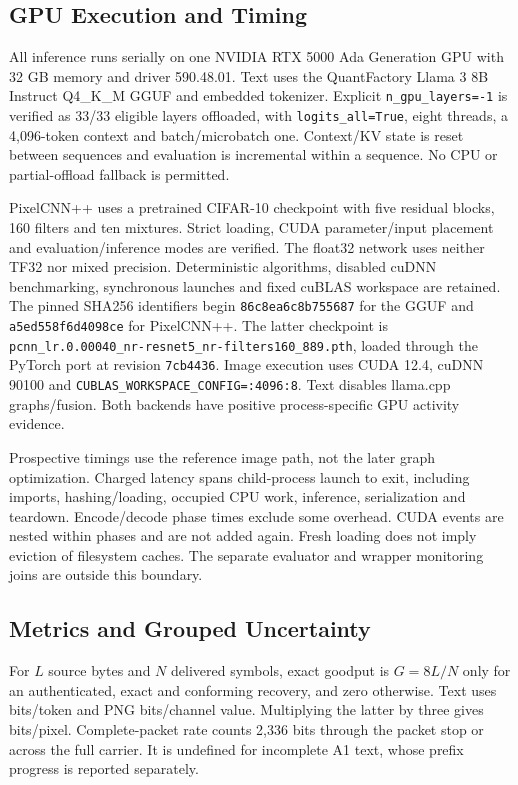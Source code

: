 \subsection{GPU Execution and Timing}
\label{sec:hardware}
All inference runs serially on one NVIDIA RTX 5000 Ada Generation GPU with 32 GB memory and driver 590.48.01. Text uses the QuantFactory Llama 3 8B Instruct Q4\_K\_M GGUF and embedded tokenizer. Explicit \texttt{n\_gpu\_layers=-1} is verified as 33/33 eligible layers offloaded, with \texttt{logits\_all=True}, eight threads, a 4,096-token context and batch/microbatch one. Context/KV state is reset between sequences and evaluation is incremental within a sequence. No CPU or partial-offload fallback is permitted.

PixelCNN++ uses a pretrained CIFAR-10 checkpoint with five residual blocks, 160 filters and ten mixtures. Strict loading, CUDA parameter/input placement and evaluation/inference modes are verified. The float32 network uses neither TF32 nor mixed precision. Deterministic algorithms, disabled cuDNN benchmarking, synchronous launches and fixed cuBLAS workspace are retained. The pinned SHA256 identifiers begin \texttt{86c8ea6c8b755687} for the GGUF and \texttt{a5ed558f6d4098ce} for PixelCNN++. The latter checkpoint is \texttt{pcnn\_lr.0.00040\_}\allowbreak\texttt{nr-resnet5\_nr-filters160\_889.pth}, loaded through the PyTorch port at revision \texttt{7cb4436}. Image execution uses CUDA 12.4, cuDNN 90100 and \texttt{CUBLAS\_WORKSPACE\_CONFIG=:4096:8}. Text disables llama.cpp graphs/fusion. Both backends have positive process-specific GPU activity evidence.

Prospective timings use the reference image path, not the later graph optimization. Charged latency spans child-process launch to exit, including imports, hashing/loading, occupied CPU work, inference, serialization and teardown. Encode/decode phase times exclude some overhead. CUDA events are nested within phases and are not added again. Fresh loading does not imply eviction of filesystem caches. The separate evaluator and wrapper monitoring joins are outside this boundary.

\subsection{Metrics and Grouped Uncertainty}
For $L$ source bytes and $N$ delivered symbols, exact goodput is $G=8L/N$ only for an authenticated, exact and conforming recovery, and zero otherwise. Text uses bits/token and PNG bits/channel value. Multiplying the latter by three gives bits/pixel. Complete-packet rate counts 2,336 bits through the packet stop or across the full carrier. It is undefined for incomplete A1 text, whose prefix progress is reported separately.

